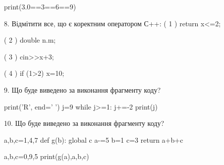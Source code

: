 \documentclass[11pt]{article}
\begin{document}
print(3.0==3==6==9)
\vspace{5mm}

8. %
Відмітити все, що є коректним оператором С++:
( 1 ) return x<=2;

( 2 ) double n.m;

( 3 ) cin>>x+3;

( 4 ) if (1>2) x=10;
\vspace{5mm}

9. Що буде виведено за виконання фрагменту коду?

print('R', end=' ')
j=9
while j>=1:
    j+=-2
print(j)

\vspace{5mm}

10. Що буде виведено за виконання фрагменту коду?

a,b,c=1,4,7
def g(b):
global c    a-=5
    b=1
    c=3
    return a+b+c

a,b,c=0,9,5
print(g(a),a,b,c)
\vspace{5mm}

\newpage
\end{document}
